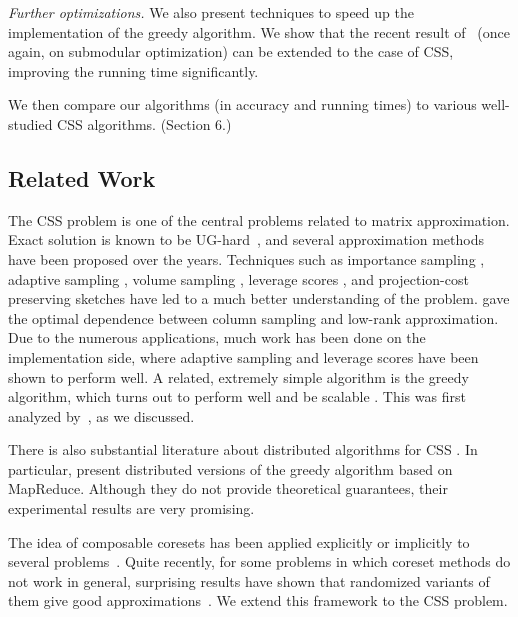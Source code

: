 \documentclass{article}
\begin{document}
{\em Further optimizations.} We also present techniques to speed up the implementation of the greedy algorithm. We show that the recent result of~\cite{Mirzasoleiman} (once again, on submodular optimization) can be extended to the case of CSS, improving the running time significantly.


We then compare our algorithms (in accuracy and running times) to various well-studied CSS algorithms. (Section 6.)

\subsection{Related Work}
The CSS problem is one of the central problems related to matrix approximation. Exact solution is known to be UG-hard~\cite{Civril2}, and several approximation methods have been proposed over the years. Techniques such as importance sampling \cite{Drineas1, Frieze}, adaptive sampling \cite{Deshpande1}, volume sampling \cite{Deshpande2, Deshpande4}, leverage scores \cite{Drineas-Leverage}, and projection-cost preserving sketches \cite{Cohen} have led to a much better understanding of the problem. \cite{Guruswami} gave the optimal dependence between column sampling and low-rank approximation.
Due to the numerous applications, much work has been done on the implementation side, where adaptive sampling and leverage scores have been shown to perform well. A related, extremely simple algorithm is the greedy algorithm, which turns out to perform well and be scalable \cite{Farahat1, Farahat2}. This was first analyzed by~\cite{Civril1}, as we discussed. 

There is also substantial literature about distributed algorithms for CSS \cite{Pi, Feldman, Cohen, Farahat3, Farahat4, Boutsidis2015}. In particular, \cite{Farahat3, Farahat4} present distributed versions of the greedy algorithm based on MapReduce. Although they do not provide theoretical guarantees, their experimental results are very promising.

The idea of composable coresets has been applied explicitly or implicitly to several problems~\cite{FeldmanSS13,BalcanEL13,VahabPODS2014}. Quite recently, for some problems in which coreset methods do not work in general, surprising results have shown that randomized variants of them give good approximations~\cite{BarbosaENW15,Mirrokni}. We extend this framework to the CSS problem.
\end{document}
